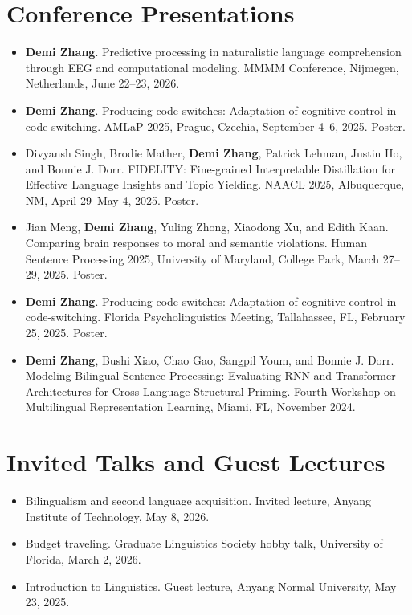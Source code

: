 \documentclass[11pt,letterpaper]{article}
\begin{document}
\section*{Conference Presentations}
\begin{itemize}
\item \textbf{Demi Zhang}. Predictive processing in naturalistic language comprehension through EEG and computational modeling. MMMM Conference, Nijmegen, Netherlands, June 22--23, 2026.
\item \textbf{Demi Zhang}. Producing code-switches: Adaptation of cognitive control in code-switching. AMLaP 2025, Prague, Czechia, September 4--6, 2025. Poster.
\item Divyansh Singh, Brodie Mather, \textbf{Demi Zhang}, Patrick Lehman, Justin Ho, and Bonnie J. Dorr. FIDELITY: Fine-grained Interpretable Distillation for Effective Language Insights and Topic Yielding. NAACL 2025, Albuquerque, NM, April 29--May 4, 2025. Poster.
\item Jian Meng, \textbf{Demi Zhang}, Yuling Zhong, Xiaodong Xu, and Edith Kaan. Comparing brain responses to moral and semantic violations. Human Sentence Processing 2025, University of Maryland, College Park, March 27--29, 2025. Poster.
\item \textbf{Demi Zhang}. Producing code-switches: Adaptation of cognitive control in code-switching. Florida Psycholinguistics Meeting, Tallahassee, FL, February 25, 2025. Poster.
\item \textbf{Demi Zhang}, Bushi Xiao, Chao Gao, Sangpil Youm, and Bonnie J. Dorr. Modeling Bilingual Sentence Processing: Evaluating RNN and Transformer Architectures for Cross-Language Structural Priming. Fourth Workshop on Multilingual Representation Learning, Miami, FL, November 2024.
\end{itemize}

\section*{Invited Talks and Guest Lectures}
\begin{itemize}
\item Bilingualism and second language acquisition. Invited lecture, Anyang Institute of Technology, May 8, 2026.
\item Budget traveling. Graduate Linguistics Society hobby talk, University of Florida, March 2, 2026.
\item Introduction to Linguistics. Guest lecture, Anyang Normal University, May 23, 2025.
\end{itemize}
\end{document}
